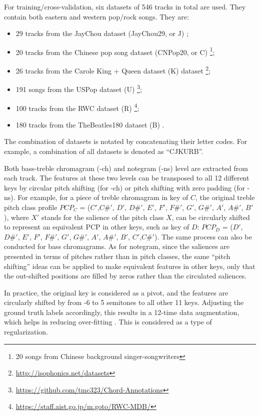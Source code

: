 For training/cross-validation, six datasets of 546 tracks in total are used. They contain both eastern and western pop/rock songs. They are:
\begin{itemize}
	\item 29 tracks from the JayChou dataset (JayChou29, or J) \cite{dengmirex};
	\item 20 tracks from the Chinese pop song dataset (CNPop20, or C) \footnote{20 songs from Chinese background singer-songwriters};
	\item 26 tracks from the Carole King + Queen dataset (K) dataset \footnote{\url{http://isophonics.net/datasets}};
	\item 191 songs from the USPop dataset (U) \footnote{\url{https://github.com/tmc323/Chord-Annotations}};
	\item 100 tracks from the RWC dataset (R) \footnote{\url{https://staff.aist.go.jp/m.goto/RWC-MDB/}};
	\item 180 tracks from the TheBeatles180 dataset (B) \cite{harte2010towards}. 
\end{itemize}
The combination of datasets is notated by concatenating their letter codes. For example, a combination of all datasets is denoted as ``CJKURB''.

Both bass-treble chromagram (-ch) and notegram (-ns) level are extracted from each track. The features at these two levels can be transposed to all 12 different keys by circular pitch shifting (for -ch) or pitch shifting with zero padding (for -ns). For example, for a piece of treble chromagram in key of $C$, the original treble pitch class profile $PCP_C$ = ($C'$,$C\#'$, $D'$, $D\#'$, $E'$, $F'$, $F\#'$, $G'$, $G\#'$, $A'$, $A\#'$, $B'$), where $X'$ stands for the salience of the pitch class $X$, can be circularly shifted to represent an equivalent PCP in other keys, such as key of $D$: $PCP_D$ = ($D'$, $D\#'$, $E'$, $F'$, $F\#'$, $G'$, $G\#'$, $A'$, $A\#'$, $B'$, $C'$,$C\#'$). The same process can also be conducted for bass chromagrams. As for notegram, since the saliences are presented in terms of pitches rather than in pitch classes, the same ``pitch shifting'' ideas can be applied to make equivalent features in other keys, only that the out-shifted positions are filled by zeros rather than the circulated saliences.

In practice, the original key is considered as a pivot, and the features are circularly shifted by from -6 to 5 semitones to all other 11 keys. Adjusting the ground truth labels accordingly, this results in a 12-time data augmentation, which helps in reducing over-fitting \cite{cho2014improved,humphrey2015exploration}. This is considered as a type of regularization.

